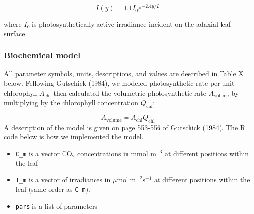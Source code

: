 \documentclass[12pt,halfline,a4paper,]{ouparticle}
\providecommand{\tightlist}{%
  \setlength{\itemsep}{0pt}\setlength{\parskip}{0pt}}
\begin{document}
\begin{equation}\label{eq:light_propogation}
  I(y) = 1.1 I_0 e ^ {-2.4 y / L}
\end{equation}

where \(I_0\) is photosynthetically active irradiance incident on the
adaxial leaf surface.

\hypertarget{biochemical-model}{%
\subsubsection{Biochemical model}\label{biochemical-model}}

All parameter symbols, units, descriptions, and values are described in
Table X below. Following Gutschick (1984), we modeled photosynthetic
rate per unit chlorophyll \(A_\text{chl}\) then calculated the
volumetric photosynthetic rate \(A_\text{volume}\) by multiplying by the
chlorophyll concentration \(Q_\text{chl}\):

\[A_\text{volume} = A_\text{chl} Q_\text{chl}\] A description of the
model is given on page 553-556 of Gutschick (1984). The R code below is
how we implemented the model.

\begin{itemize}
\tightlist
\item
  \texttt{C\_m} is a vector CO\(_2\) concentrations in
  \(\text{mmol m}^{-3}\) at different positions within the leaf
\item
  \texttt{I\_m} is a vector of irradiances in
  \(\mu \text{mol m}^{-2} \text{s}^{-1}\) at different positions within
  the leaf (same order as \texttt{C\_m}).
\item
  \texttt{pars} is a list of parameters
\end{itemize}
\end{document}
